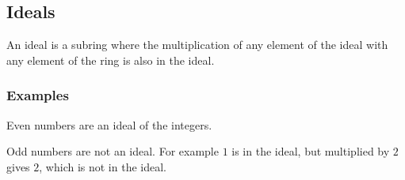 
\subsection{Ideals}

An ideal is a subring where the multiplication of any element of the ideal with any element of the ring is also in the ideal.

\subsubsection{Examples}

Even numbers are an ideal of the integers.

Odd numbers are not an ideal. For example \(1\) is in the ideal, but multiplied by \(2\) gives \(2\), which is not in the ideal.

